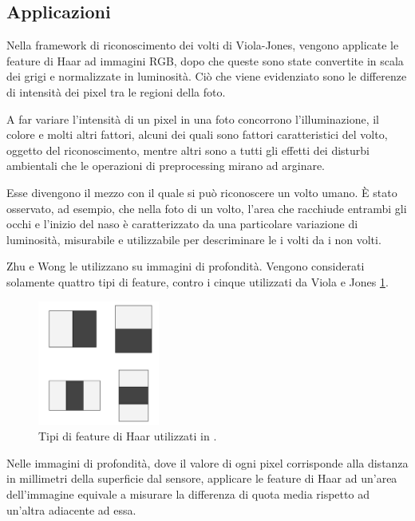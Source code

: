         \subsection{Applicazioni} %
        \label{sub:haar_features_applications}
            Nella framework di riconoscimento dei volti di Viola-Jones, vengono applicate le feature di Haar ad immagini RGB, dopo che queste sono state convertite in scala dei grigi e normalizzate in luminosità.
            Ciò che viene evidenziato sono le differenze di intensità dei pixel tra le regioni della foto.

            A far variare l'intensità di un pixel in una foto concorrono l'illuminazione, il colore e molti altri fattori, alcuni dei quali sono fattori caratteristici del volto, oggetto del riconoscimento, mentre altri sono a tutti gli effetti dei disturbi ambientali che le operazioni di preprocessing mirano ad arginare.

            Esse divengono il mezzo con il quale si può riconoscere un volto umano.
            È stato osservato, ad esempio, che nella foto di un volto, l'area che racchiude entrambi gli occhi e l'inizio del naso è caratterizzato da una particolare variazione di luminosità, misurabile e utilizzabile per descriminare le i volti da i non volti.

            Zhu e Wong le utilizzano su immagini di profondità.
            Vengono considerati solamente quattro tipi di feature, contro i cinque utilizzati da Viola e Jones \ref{fig:features_type}.
            \begin{figure}
                \centering
                \includegraphics[width=4cm]{img/feature_types.jpg}
                \caption{Tipi di feature di Haar utilizzati in \cite{Zhu13}.}
                \label{fig:features_type}
            \end{figure}

            Nelle immagini di profondità, dove il valore di ogni pixel corrisponde alla distanza in millimetri della superficie dal sensore, applicare le feature di Haar ad un'area dell'immagine equivale a misurare la differenza di quota media rispetto ad un'altra adiacente ad essa.

